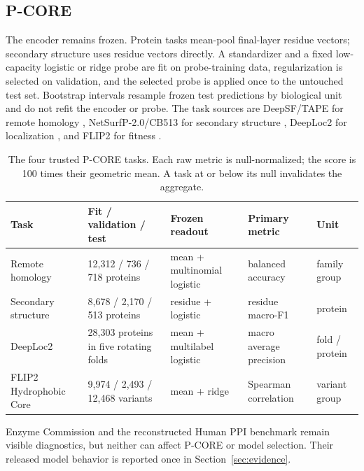 \documentclass{article}
\begin{document}
\subsection{P-CORE}

The encoder remains frozen. Protein tasks mean-pool final-layer residue
vectors; secondary structure uses residue vectors directly. A standardizer
and a fixed low-capacity logistic or ridge probe are fit on probe-training
data, regularization is selected on validation, and the selected probe is
applied once to the untouched test set. Bootstrap intervals resample frozen
test predictions by biological unit and do not refit the encoder or probe.
The task sources are DeepSF/TAPE for remote homology
\citep{hou2018deepsf,rao2019tape}, NetSurfP-2.0/CB513 for secondary structure
\citep{klausen2019netsurfp,cuff1999evaluation}, DeepLoc2 for localization
\citep{thumuluri2022deeploc2}, and FLIP2 for fitness
\citep{didi2026flip2}.

\begin{table}[H]
  \centering
  \small
  \setlength{\tabcolsep}{3pt}
  \begin{tabularx}{\textwidth}{@{}p{}p{}p{}YY@{}}
    \toprule
    Task & Fit / validation / test & Frozen readout & Primary metric & Unit \\
    \midrule
    Remote homology & 12,312 / 736 / 718 proteins & mean + multinomial logistic & balanced accuracy & family group \\
    Secondary structure & 8,678 / 2,170 / 513 proteins & residue + logistic & residue macro-F1 & protein \\
    DeepLoc2 & 28,303 proteins in five rotating folds & mean + multilabel logistic & macro average precision & fold / protein \\
    FLIP2 Hydrophobic Core & 9,974 / 2,493 / 12,468 variants & mean + ridge & Spearman correlation & variant group \\
    \bottomrule
  \end{tabularx}
  \caption{The four trusted P-CORE tasks. Each raw metric is null-normalized;
  the score is 100 times their geometric mean. A task at or below its null
  invalidates the aggregate.}
  \label{tab:pcore-contract}
\end{table}

Enzyme Commission and the reconstructed Human PPI benchmark remain visible
diagnostics, but neither can affect P-CORE or model selection. Their released
model behavior is reported once in Section~\ref{sec:evidence}.
\end{document}
